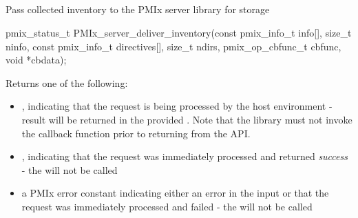 \subsection{}

\summary

Pass collected inventory to the \ac{PMIx} server library for storage

\format

\cspecificstart
\begin{codepar}
pmix_status_t
PMIx_server_deliver_inventory(const pmix_info_t info[],
                              size_t ninfo,
                              const pmix_info_t directives[],
                              size_t ndirs,
                              pmix_op_cbfunc_t cbfunc,
                              void *cbdata);
\end{codepar}
\cspecificend

\begin{arglist}
\end{arglist}

Returns one of the following:

\begin{itemize}
    \item {}, indicating that the request is being processed by the host environment - result will be returned in the provided . Note that the library must not invoke the callback function prior to returning from the \ac{API}.
    \item {}, indicating that the request was immediately processed and returned \textit{success} - the  will not be called
    \item a PMIx error constant indicating either an error in the input or that the request was immediately processed and failed - the  will not be called
\end{itemize}


